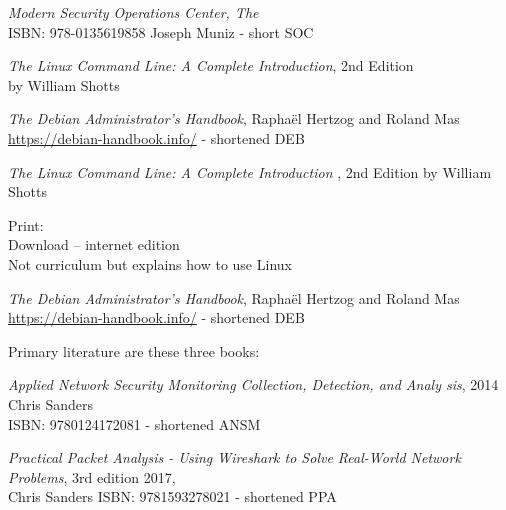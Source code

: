 \documentclass[Screen16to9,17pt]{foils}
\begin{document}


\emph{Modern Security Operations Center, The}\\
ISBN: 978-0135619858 Joseph Muniz - short SOC

\begin{list2}
\item \emph{The Linux Command Line: A Complete Introduction}, 2nd Edition\\
 by William Shotts
\item \emph{The Debian Administrator’s Handbook}, Raphaël Hertzog and Roland Mas\\
\url{https://debian-handbook.info/} - shortened DEB
\end{list2}



\emph{The Linux Command Line: A Complete Introduction }, 2nd Edition
by William Shotts

Print: \\
Download -- internet edition \\
Not curriculum but explains how to use Linux



\emph{The Debian Administrator’s Handbook}, Raphaël Hertzog and Roland Mas\\
\url{https://debian-handbook.info/} - shortened DEB


Primary literature are these three books:
\begin{list2}
\item \emph{Applied Network Security Monitoring Collection, Detection, and Analy
sis}, 2014 Chris Sanders \\
ISBN: 9780124172081 - shortened ANSM
\item \emph{Practical Packet Analysis - Using Wireshark to Solve Real-World Network Problems}, 3rd edition 2017, \\
Chris Sanders ISBN: 9781593278021 - shortened PPA
\end{list2}
\end{document}
